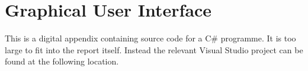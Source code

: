 \chapter{Graphical User Interface}
\label{app:C}
This is a digital appendix containing source code for a C\# programme. It is too large to fit into the report itself.
Instead the relevant Visual Studio project can be found at the following location.

\setlength{\parindent}{0pt} {
 \\
}